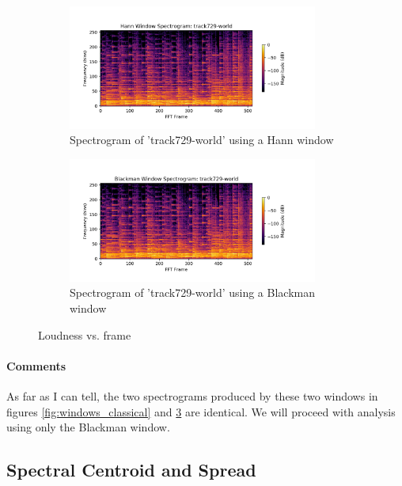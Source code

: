 \documentclass[11pt,a4paper]{article}
\begin{document}
\begin{figure}[tb]
	\centering
	\begin{subfigure}[t]{\hsize}
		\centering
		\includegraphics[width=0.9\textwidth]{powerHann_track729-world}
		\caption{Spectrogram of 'track729-world' using a Hann window}
		\label{fig:hann_world}
	\end{subfigure}
	\begin{subfigure}[t]{\hsize}
		\centering
		\includegraphics[width=0.9\textwidth]{powerBlack_track729-world}
		\caption{Spectrogram of 'track729-world' using a Blackman window}
		\label{fig:black_world}
	\end{subfigure}
	\caption{Loudness vs. frame}
	\label{fig:windows_world}
\end{figure}
\clearpage

\paragraph{Comments} As far as I can tell, the two spectrograms produced by these two windows in figures \ref{fig:windows_classical} and \ref{fig:windows_world} are identical. We will proceed with analysis using only the Blackman window.

\subsection{Spectral Centroid and Spread}
\end{document}
